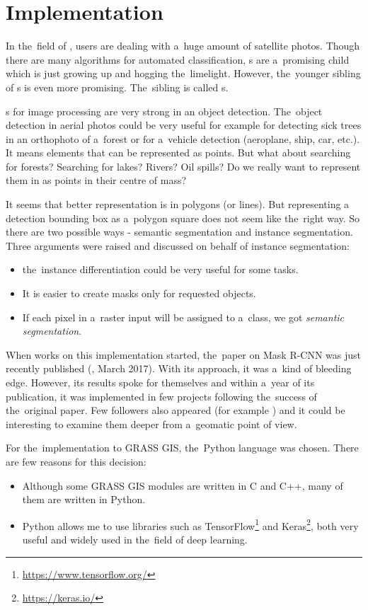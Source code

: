 \chapter{Implementation}
\label{implementation}

In the~field of , users are dealing with a~huge amount of satellite photos.
Though there are many algorithms for automated classification, s are
a~promising child which is just growing up and hogging the~limelight. However,
the~younger sibling of s is even more promising. The~sibling is called 
s.

s for image processing are very strong in an object detection.
The~object detection in aerial photos could be very useful for example for detecting 
sick trees in an orthophoto of a~forest or for a~vehicle detection (aeroplane, 
ship, car, etc.). It means elements that can be represented as points. But what 
about searching for forests? Searching for lakes? Rivers? Oil spills? Do we 
really want to represent them in  as points in their centre of mass?

It seems that better representation is in polygons (or lines). But representing 
a detection bounding box as a~polygon square does not seem like the~right way. 
So there are two possible ways - semantic segmentation and instance 
segmentation. Three arguments were raised and discussed on behalf of instance 
segmentation:
\begin{itemize}
	\item the~instance differentiation could be very useful for some tasks.
	\item It is easier to create masks only for requested objects.
	\item If each pixel in a~raster input will be assigned to a~class, we got \textit{semantic segmentation}.
\end{itemize}

When works on this implementation started, the~paper on Mask R-CNN was just 
recently published (\cite{mask-rcnn}, March 2017). With its approach, it was
a~kind of bleeding edge. However, its results spoke for themselves and within
a~year of its publication, it was implemented in few projects following
the~success of the~original paper. Few followers also appeared (for example 
\cite{masklab}) and it could be interesting to examine them deeper from
a~geomatic point of view.

For the~implementation to GRASS GIS, the~Python language was chosen. There are 
few reasons for this decision:
\begin{itemize}
	\item Although some GRASS GIS modules are written in C and C++, many of them are written in Python.
	\item Python allows me to use libraries such as TensorFlow\footnote{\url{https://www.tensorflow.org/}} and Keras\footnote{\url{https://keras.io/}}, both very useful and widely used in the~field of deep learning. 
\end{itemize}

